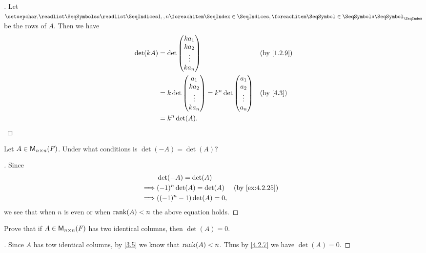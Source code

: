 \begin{proof}[]
  Let \(\seq{a}{1,,n}\) be the rows of \(A\).
  Then we have
  \begin{align*}
    \det(kA) & = \det\begin{pmatrix}
                       k a_1  \\
                       k a_2  \\
                       \vdots \\
                       k a_n
                     \end{pmatrix}                   &  & \text{(by \cref{1.2.9})}       \\
             & = k \det\begin{pmatrix}
                         a_1    \\
                         k a_2  \\
                         \vdots \\
                         k a_n
                       \end{pmatrix} = k^n \det\begin{pmatrix}
                                                 a_1    \\
                                                 a_2    \\
                                                 \vdots \\
                                                 a_n
                                               \end{pmatrix} &  & \text{(by \cref{4.3})} \\
             & = k^n \det(A).
  \end{align*}
\end{proof}

\begin{ex}\label{ex:4.2.26}
  Let \(A \in \mathsf{M}_{{n} \times n}({\mathit{F}})\).
  Under what conditions is \(\det(-A) = \det(A)\)?
\end{ex}

\begin{proof}[]
  Since
  \begin{align*}
             & \det(-A) = \det(A)                                          \\
    \implies & (-1)^n \det(A) = \det(A)  &  & \text{(by \cref{ex:4.2.25})} \\
    \implies & ((-1)^n - 1) \det(A) = 0,
  \end{align*}
  we see that when \(n\) is even or when \(\rk{A} < n\) the above equation holds.
\end{proof}

\begin{ex}\label{ex:4.2.27}
  Prove that if \(A \in \mathsf{M}_{{n} \times n}({\mathit{F}})\) has two identical columns, then \(\det(A) = 0\).
\end{ex}

\begin{proof}[]
  Since \(A\) has tow identical columns, by \cref{3.5} we know that \(\rk{A} < n\).
  Thus by \cref{4.2.7} we have \(\det(A) = 0\).
\end{proof}
